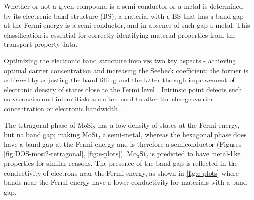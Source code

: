 \documentclass[7.5pt]{article}
\theoremstyle{plain}
\theoremstyle{definition}
\newcommand{\<}{\langle}
\renewcommand{\>}{\rangle}
\begin{document}
\begin{multicols}{2}

 \noindent Whether or not a given compound is a semi-conductor or a metal is determined by its electronic band structure (BS); a material with a BS that has a band gap at the Fermi energy is a semi-conductor, and in absence of such gap a metal.
This classification is essential for correctly identifying material properties from the transport property data. 

Optimizing the electronic band structure involves two key aspects - achieving optimal carrier concentration and increasing the Seebeck coefficient; the former is achieved by adjusting the band filling and the latter through improvement of electronic density of states close to the Fermi level \cite{ZhuTiejun2016NIiI}.
Intrinsic point defects such as vacancies and interstitials are often used to alter the charge carrier concentration or electronic bandwidth \cite{ZhengYun2021Deit}. 

The tetragonal phase of $\text{Mo}\text{Si}_2$ has a low density of states at the Fermi energy, but no band gap; making $\text{Mo}\text{Si}_2$ a semi-metal, whereas the hexagonal phase does have a band gap at the Fermi energy and is therefore a semiconductor (Figures \ref{fig:DOS-mosi2-tetragonal}, \ref{fig:e-plots}). 
$\text{Mo}_3\text{Si}_2$ is predicted to have metal-like properties for similar reasons. 
The presence of the band gap is reflected in the conductivity of electrons near the Fermi energy, as shown in \autoref{fig:e-plots} where bands near the Fermi energy have a lower conductivity for materials with a band gap. 

\end{multicols}
\end{document}
